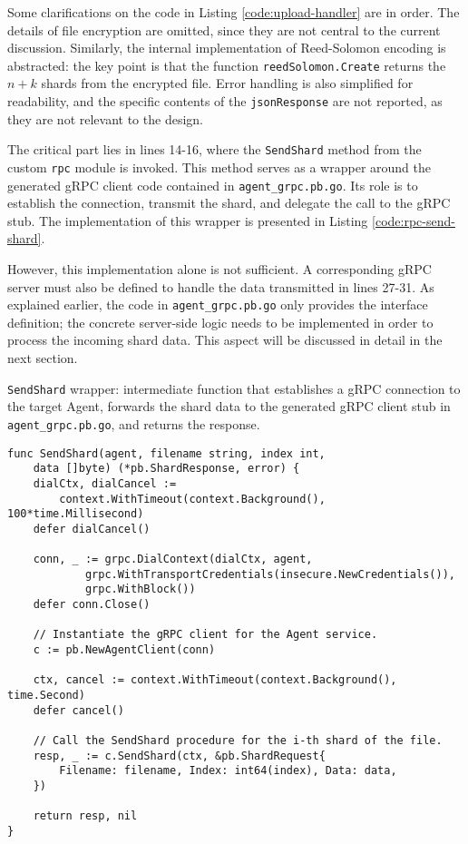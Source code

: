 Some clarifications on the code in Listing \ref{code:upload-handler} are in order.
The details of file encryption are omitted, since they are not central to the current discussion. Similarly, the internal implementation of Reed-Solomon encoding is abstracted: the key point is that the function \texttt{reedSolomon.Create} returns the $n+k$ shards from the encrypted file. Error handling is also simplified for readability, and the specific contents of the \texttt{jsonResponse} are not reported, as they are not relevant to the design.

The critical part lies in lines 14-16, where the \texttt{SendShard} method from the custom \texttt{rpc} module is invoked. This method serves as a wrapper around the generated gRPC client code contained in \texttt{agent\_grpc.pb.go}. Its role is to establish the connection, transmit the shard, and delegate the call to the gRPC stub. The implementation of this wrapper is presented in Listing \ref{code:rpc-send-shard}.

However, this implementation alone is not sufficient. A corresponding gRPC server must also be defined to handle the data transmitted in lines 27-31. As explained earlier, the code in \texttt{agent\_grpc.pb.go} only provides the interface definition; the concrete server-side logic needs to be implemented in order to process the incoming shard data. This aspect will be discussed in detail in the next section.

\begin{listing}
\caption{\texttt{SendShard} wrapper: intermediate function that establishes a gRPC connection to the target Agent, forwards the shard data to the generated gRPC client stub in \texttt{agent\_grpc.pb.go}, and returns the response.}
\label{code:rpc-send-shard}
\begin{verbatim}
func SendShard(agent, filename string, index int, 
    data []byte) (*pb.ShardResponse, error) {
    dialCtx, dialCancel := 
        context.WithTimeout(context.Background(), 100*time.Millisecond)
	defer dialCancel()

    conn, _ := grpc.DialContext(dialCtx, agent,
            grpc.WithTransportCredentials(insecure.NewCredentials()),
            grpc.WithBlock())
    defer conn.Close()

    // Instantiate the gRPC client for the Agent service.
    c := pb.NewAgentClient(conn) 

    ctx, cancel := context.WithTimeout(context.Background(), time.Second)
    defer cancel()

    // Call the SendShard procedure for the i-th shard of the file.
    resp, _ := c.SendShard(ctx, &pb.ShardRequest{
        Filename: filename, Index: int64(index), Data: data,
    })

    return resp, nil
}
\end{verbatim}
\end{listing}

